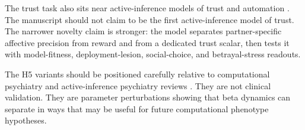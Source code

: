 The trust task also sits near active-inference models of trust and automation . The manuscript should not claim to be the first active-inference model of trust. The narrower novelty claim is stronger: the model separates partner-specific affective precision from reward and from a dedicated trust scalar, then tests it with model-fitness, deployment-lesion, social-choice, and betrayal-stress readouts.

The H5 variants should be positioned carefully relative to computational psychiatry and active-inference psychiatry reviews . They are not clinical validation. They are parameter perturbations showing that beta dynamics can separate in ways that may be useful for future computational phenotype hypotheses.
